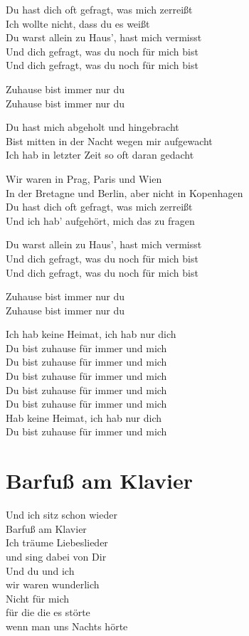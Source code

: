 \documentclass[]{book}
\begin{document}
Du hast dich oft gefragt, was mich zerreißt\\
Ich wollte nicht, dass du es weißt\\
Du warst allein zu Haus', hast mich vermisst\\
Und dich gefragt, was du noch für mich bist\\
Und dich gefragt, was du noch für mich bist

Zuhause bist immer nur du\\
Zuhause bist immer nur du

Du hast mich abgeholt und hingebracht\\
Bist mitten in der Nacht wegen mir aufgewacht\\
Ich hab in letzter Zeit so oft daran gedacht

Wir waren in Prag, Paris und Wien\\
In der Bretagne und Berlin, aber nicht in Kopenhagen\\
Du hast dich oft gefragt, was mich zerreißt\\
Und ich hab' aufgehört, mich das zu fragen

Du warst allein zu Haus', hast mich vermisst\\
Und dich gefragt, was du noch für mich bist\\
Und dich gefragt, was du noch für mich bist

Zuhause bist immer nur du\\
Zuhause bist immer nur du

Ich hab keine Heimat, ich hab nur dich\\
Du bist zuhause für immer und mich\\
Du bist zuhause für immer und mich\\
Du bist zuhause für immer und mich\\
Du bist zuhause für immer und mich\\
Du bist zuhause für immer und mich\\
Hab keine Heimat, ich hab nur dich\\
Du bist zuhause für immer und mich

\hypertarget{barfu-am-klavier-1}{%
\section{Barfuß am Klavier}\label{barfu-am-klavier-1}}

Und ich sitz schon wieder\\
Barfuß am Klavier\\
Ich träume Liebeslieder\\
und sing dabei von Dir\\
Und du und ich\\
wir waren wunderlich\\
Nicht für mich\\
für die die es störte\\
wenn man uns Nachts hörte
\end{document}
